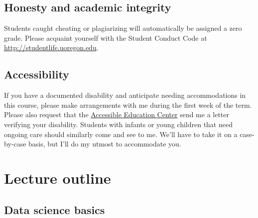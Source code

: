 \documentclass[12]{article}
\begin{document}

\subsection*{Honesty and academic integrity}

Students caught cheating or plagiarizing will automatically be assigned a zero grade. Please acquaint yourself with the Student Conduct Code at \url{http://studentlife.uoregon.edu}.

\subsection*{Accessibility}

If you have a documented disability and anticipate needing accommodations in this course, please make arrangements with me during the first week of the term. Please also request that the \href{https://aec.uoregon.edu/}{Accessible Education Center} send me a letter verifying your disability. Students with infants or young children that need ongoing care should similarly come and see to me. We'll have to take it on a case-by-case basis, but I'll do my utmost to accommodate you.

\newpage
\section*{Lecture outline}
\label{sec:outline}


\subsection*{Data science basics}
\end{document}
